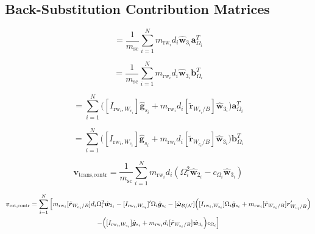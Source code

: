 \documentclass[]{BasiliskReportMemo}
\begin{document}
\subsection{Back-Substitution Contribution Matrices}

\begin{equation}
[A_\text{contr}] = \frac{1}{m_{\text{sc}}}\sum\limits_{i=1}^{N}m_{\text{rw}_i}d_i\hat{\bm{w}}_{3_i}\bm{a}_{\Omega_i}^T
\end{equation}

\begin{equation}
[B_\text{contr}] = \frac{1}{m_{\text{sc}}}\sum\limits_{i=1}^{N}m_{\text{rw}_i}d_i\hat{\bm{w}}_{3_i}\bm{b}_{\Omega_i}^T
\end{equation}

\begin{equation}
[C_\text{contr}] = \sum\limits_{i=1}^{N}\Big([I_{\text{rw}_i,W_{c_i}}]\hat{\bm{g}}_{s_i} + m_{\text{rw}_i}d_i[\tilde{\bm{r}}_{W_{c_i}/B}]\hat{\bm{w}}_{3_i}\Big)\bm{a}_{\Omega_i}^T
\end{equation}

\begin{equation}
[D_\text{contr}] = \sum\limits_{i=1}^{N}\Big([I_{\text{rw}_i,W_{c_i}}]\hat{\bm{g}}_{s_i} + m_{\text{rw}_i}d_i[\tilde{\bm{r}}_{W_{c_i}/B}]\hat{\bm{w}}_{3_i}\Big)\bm{b}_{\Omega_i}^T
\end{equation}

\begin{equation}
\bm{v}_\text{trans,contr} = \frac{1}{m_{\text{sc}}}\sum\limits_{i=1}^{N}m_{\text{rw}_i}d_i\left(\Omega_i^2\hat{\bm{w}}_{2_i}-c_{\Omega_i}\hat{\bm{w}}_{3_i}\right)
\end{equation}

\begin{multline}
\bm{v}_\text{rot,contr} = \sum\limits_{i=1}^{N} \Big[ m_{\text{rw}_i}[\tilde{\bm{r}}_{W_{c_i}/B}]d_i \Omega_i^2\hat{\bm{w}}_{2_i}-[I_{\text{rw}_i,W_{c_i}}]'\Omega_i \hat{\bm{g}}_{s_i} -[\tilde{\bm\omega}_{\cal B/N}]\Big([I_{\text{rw}_i,W_{c_i}}]\Omega_i \hat{\bm{g}}_{s_i}+ m_{\text{rw}_i}[\tilde{\bm{r}}_{W_{c_i}/B}]\bm{r}'_{W_{c_i}/B}\Big) \\ 
-\Big([I_{\text{rw}_i,W_{c_i}}]\hat{\bm{g}}_{s_i} + m_{\text{rw}_i}d_i[\tilde{\bm{r}}_{W_{c_i}/B}]\hat{\bm{w}}_{3_i}\Big)c_{\Omega_i} \Big]
\end{multline}
\end{document}
